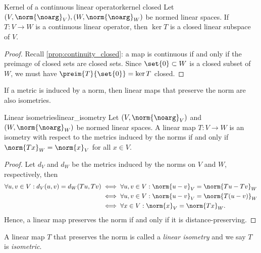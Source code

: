 \begin{proposition}{Kernel of a continuous linear operator}{kernel closed}
    Let \((V, \norm{\noarg}_V), (W, \norm{\noarg}_W)\) be normed linear spaces. If \(T : V \to W\) is a continuous linear operator, then \(\ker{T}\) is a closed linear subspace of \(V\).
\end{proposition}
\begin{proof}
    Recall \cref{prop:continuity_closed}: a map is continuous if and only if the preimage of closed sets are closed sets. Since \(\set{0} \subset W\) is a closed subset of \(W\), we must have \(\preim{T}{\set{0}} = \ker{T}\) closed.
\end{proof}

If a metric is induced by a norm, then linear maps that preserve the norm are also isometries.
\begin{proposition}{Linear isometries}{linear_isometry}
    Let \((V, \norm{\noarg}_V)\) and \((W, \norm{\noarg}_W)\) be normed linear spaces. A linear map \(T : V \to W\) is an isometry with respect to the metrics induced by the norms if and only if \(\norm{Tx}_W = \norm{x}_V\) for all \(x \in V\).
\end{proposition}
\begin{proof}
    Let \(d_V\) and \(d_W\) be the metrics induced by the norms on \(V\) and \(W\), respectively, then
    \begin{align*}
        \forall u, v \in V: d_V(u,v) = d_W(Tu, Tv) &\iff \forall u,v \in V: \norm{u-v}_V = \norm{Tu - Tv}_W\\
                                                   &\iff \forall u,v \in V: \norm{u-v}_V = \norm{T(u-v)}_W\\
                                                   &\iff \forall x \in V: \norm{x}_V = \norm{Tx}_W.
    \end{align*}
    Hence, a linear map preserves the norm if and only if it is distance-preserving.
\end{proof}
\begin{remark}
    A linear map \(T\) that preserves the norm is called a \emph{linear isometry} and we say \(T\) is \emph{isometric}.
\end{remark}

